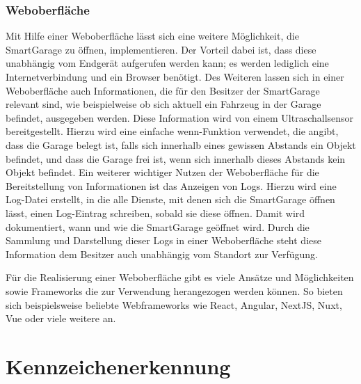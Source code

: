 \subsection{Weboberfläche}
Mit Hilfe einer Weboberfläche lässt sich eine weitere Möglichkeit, die SmartGarage zu öffnen, implementieren. Der Vorteil dabei ist, dass diese unabhängig vom Endgerät aufgerufen werden kann; es werden lediglich eine Internetverbindung und ein Browser benötigt. Des Weiteren lassen sich in einer Weboberfläche auch Informationen, die für den Besitzer der SmartGarage relevant sind, wie beispielweise ob sich aktuell ein Fahrzeug in der Garage befindet, ausgegeben werden. Diese Information wird von einem Ultraschallsensor bereitgestellt. Hierzu wird eine einfache wenn-Funktion verwendet, die angibt, dass die Garage belegt ist, falls sich innerhalb eines gewissen Abstands ein Objekt befindet, und dass die Garage frei ist, wenn sich innerhalb dieses Abstands kein Objekt befindet.
Ein weiterer wichtiger Nutzen der Weboberfläche für die Bereitstellung von Informationen ist das Anzeigen von Logs. Hierzu wird eine Log-Datei erstellt, in die alle Dienste, mit denen sich die SmartGarage öffnen lässt, einen Log-Eintrag schreiben, sobald sie diese öffnen. Damit wird dokumentiert, wann und wie die SmartGarage geöffnet wird. Durch die Sammlung und Darstellung dieser Logs in einer Weboberfläche steht diese Information dem Besitzer auch unabhängig vom Standort zur Verfügung.

Für die Realisierung einer Weboberfläche gibt es viele Ansätze und Möglichkeiten sowie Frameworks die zur Verwendung herangezogen werden können. So bieten sich beispielsweise beliebte Webframeworks wie React, Angular, NextJS, Nuxt, Vue oder viele weitere an. 


\nocite{*}

\chapter{Kennzeichenerkennung}

